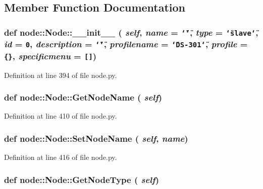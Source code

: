 \subsection{Member Function Documentation}
\hypertarget{classnode_1_1Node_40b0e5cff99fbfc4ab0999c16ad431ee}{
\subsubsection[\_\-\_\-init\_\-\_\-]{\setlength{\rightskip}{0pt plus 5cm}def node::Node::\_\-\_\-init\_\-\_\- ( {\em self},  {\em name} = {\tt \char`\"{}\char`\"{}},  {\em type} = {\tt \char`\"{}slave\char`\"{}},  {\em id} = {\tt 0},  {\em description} = {\tt \char`\"{}\char`\"{}},  {\em profilename} = {\tt \char`\"{}DS-301\char`\"{}},  {\em profile} = {\tt \{\}},  {\em specificmenu} = {\tt \mbox{[}\mbox{]}})}}
\label{classnode_1_1Node_40b0e5cff99fbfc4ab0999c16ad431ee}




Definition at line 394 of file node.py.\hypertarget{classnode_1_1Node_6eff921e4bda68b120e02b070b91d5b8}{
\subsubsection[GetNodeName]{\setlength{\rightskip}{0pt plus 5cm}def node::Node::Get\-Node\-Name ( {\em self})}}
\label{classnode_1_1Node_6eff921e4bda68b120e02b070b91d5b8}




Definition at line 410 of file node.py.\hypertarget{classnode_1_1Node_541cc4bb271d7a6bc215150b37a4b56f}{
\subsubsection[SetNodeName]{\setlength{\rightskip}{0pt plus 5cm}def node::Node::Set\-Node\-Name ( {\em self},  {\em name})}}
\label{classnode_1_1Node_541cc4bb271d7a6bc215150b37a4b56f}




Definition at line 416 of file node.py.\hypertarget{classnode_1_1Node_de5ee2b5a7f99d7ad36d86b2850d5d45}{
\subsubsection[GetNodeType]{\setlength{\rightskip}{0pt plus 5cm}def node::Node::Get\-Node\-Type ( {\em self})}}
\label{classnode_1_1Node_de5ee2b5a7f99d7ad36d86b2850d5d45}




